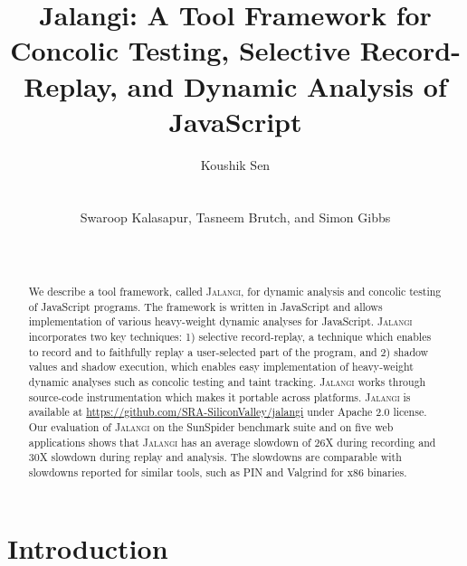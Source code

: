 \documentclass{sig-alternate}
\def\jalangi{\textsc{Jalangi}}
\begin{document}

\title{Jalangi: A Tool Framework for Concolic Testing, Selective
  Record-Replay, and Dynamic Analysis of JavaScript}

\author{
\alignauthor
Koushik Sen\\
      \\
      \\
\alignauthor
Swaroop Kalasapur, Tasneem Brutch,  and Simon Gibbs\\
\\
\\
}
\maketitle
\sloppy

\begin{abstract}
  We describe a tool framework, called \jalangi{}, for dynamic
  analysis and concolic testing of JavaScript programs.  The framework
  is written in JavaScript and allows implementation of various
  heavy-weight dynamic analyses for JavaScript. \jalangi{}
  incorporates two key techniques: 1) selective record-replay, a
  technique which enables to record and to faithfully replay a
  user-selected part of the program, and 2) shadow values and shadow
  execution, which enables easy implementation of heavy-weight dynamic
  analyses such as concolic testing and taint tracking.  \jalangi{}
  works through source-code instrumentation which makes it portable
  across platforms.  \jalangi{} is available at
  \url{https://github.com/SRA-SiliconValley/jalangi} under Apache 2.0
  license.  Our evaluation of \jalangi{} on the SunSpider benchmark
  suite and on five web applications shows that \jalangi{} has an
  average slowdown of 26X during recording and 30X slowdown during
  replay and analysis.  The slowdowns are comparable with slowdowns
  reported for similar tools, such as PIN and Valgrind for x86
  binaries.
\end{abstract}

\section{Introduction}
\end{document}
